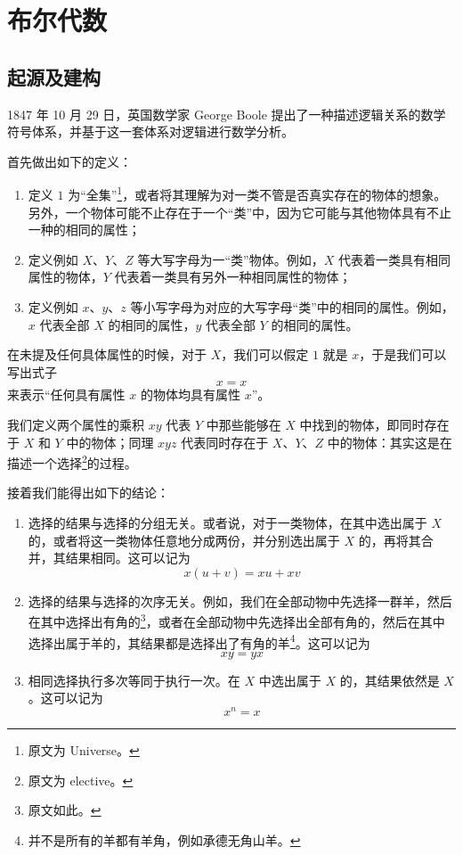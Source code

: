 \section{布尔代数}\label{sec:Calcuations/BooleanAlgebra}
    \subsection{起源及建构}\label{subsec:Calculations/BooleanAlgebra/OriginAndBuilding}
        1847 年 10 月 29 日，英国数学家 George Boole 提出了一种描述逻辑关系的数学符号体系，并基于这一套体系对逻辑进行数学分析\cite{boole-1847}。

        首先做出如下的定义：
        \begin{enumerate}
            \item 定义 $1$ 为“全集”\footnote{原文为 Universe。}，或者将其理解为对一类不管是否真实存在的物体的想象。另外，一个物体可能不止存在于一个“类”中，因为它可能与其他物体具有不止一种的相同的属性；
            \item 定义例如 $X$、$Y$、$Z$ 等大写字母为一“类”物体。例如，$X$ 代表着一类具有相同属性的物体，$Y$ 代表着一类具有另外一种相同属性的物体；
            \item 定义例如 $x$、$y$、$z$ 等小写字母为对应的大写字母“类”中的相同的属性。例如，$x$ 代表全部 $X$ 的相同的属性，$y$ 代表全部 $Y$ 的相同的属性。
        \end{enumerate}

        在未提及任何具体属性的时候，对于 $X$，我们可以假定 $1$ 就是 $x$，于是我们可以写出式子\[x = x\]来表示“任何具有属性 $x$ 的物体均具有属性 $x$”。

        我们定义两个属性的乘积 $xy$ 代表 $Y$ 中那些能够在 $X$ 中找到的物体，即同时存在于 $X$ 和 $Y$ 中的物体；同理 $xyz$ 代表同时存在于 $X$、$Y$、$Z$ 中的物体：其实这是在描述一个选择\footnote{原文为 elective。}的过程。

        接着我们能得出如下的结论：
        \begin{enumerate}
            \item 选择的结果与选择的分组无关。或者说，对于一类物体，在其中选出属于 $X$ 的，或者将这一类物体任意地分成两份，并分别选出属于 $X$ 的，再将其合并，其结果相同。这可以记为\[x(u + v) = xu + xv\]
            \item 选择的结果与选择的次序无关。例如，我们在全部动物中先选择一群羊，然后在其中选择出有角的\footnote{原文如此。}，或者在全部动物中先选择出全部有角的，然后在其中选择出属于羊的，其结果都是选择出了有角的羊\footnote{并不是所有的羊都有羊角，例如承德无角山羊。}。这可以记为\[xy = yx\]
            \item 相同选择执行多次等同于执行一次。在 $X$ 中选出属于 $X$ 的，其结果依然是 $X$。这可以记为\[x ^ n = x\]
        \end{enumerate}

